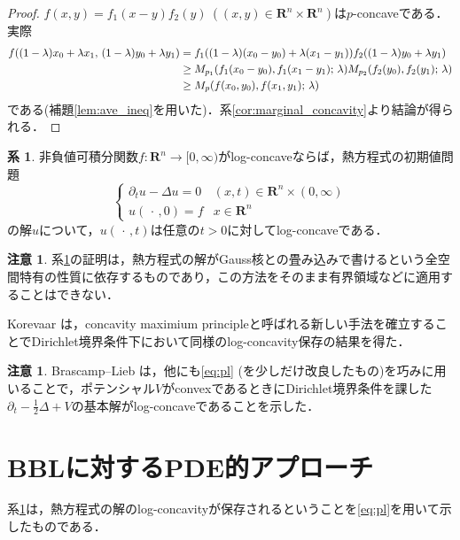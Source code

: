 \documentclass[a4j]{ltjsarticle}
\newcommand{\Rset}{\mathbf{R}}
\newcommand{\1}{\bm{1}}
\newcommand{\M}[4]{M_{#1}\qty(#2,#3;\,#4)}
\numberwithin{equation}{section}
\theoremstyle{definition}
\newtheorem{cor}[thm]{系}
\newtheorem{rmk}[thm]{注意}
\begin{document}
\begin{proof}
    $f(x,y)=f_1(x-y)f_2(y)\ ((x,y)\in \Rset^n\times\Rset^n)$は$p$-concaveである．実際
    \begin{align}
        f((1-\lambda)x_0+\lambda x_1,\,(1-\lambda)y_0+\lambda y_1)&=f_1((1-\lambda)(x_0-y_0)+\lambda(x_1-y_1))f_2((1-\lambda)y_0+\lambda y_1)\\
        &\geq \M{p_1}{f_1(x_0-y_0)}{f_1(x_1-y_1)}{\lambda}\M{p_2}{f_2(y_0)}{f_2(y_1)}{\lambda}\\
        &\geq \M{p}{f(x_0,y_0)}{f(x_1,y_1)}{\lambda}
    \end{align}
    である(補題\ref{lem:ave_ineq}を用いた)．系\ref{cor:marginal_concavity}より結論が得られる．
\end{proof}
\begin{cor}\label{cor:heat_concavity}
    非負値可積分関数$f\colon \Rset^n\to[0,\infty)$がlog-concaveならば，熱方程式の初期値問題
    \begin{equation}
        \left\{
        \begin{array}{rl}
            \partial_{t}u-\Delta u=0 & (x,t)\in\Rset^n\times (0,\infty)\\
            u(\,\cdot\,,0)=f & x\in\Rset^n
        \end{array}
        \right.
    \end{equation}
    の解$u$について，$u(\,\cdot\,,t)$は任意の$t>0$に対してlog-concaveである．
\end{cor}
\begin{rmk}
    系\ref{cor:heat_concavity}の証明は，熱方程式の解がGauss核との畳み込みで書けるという全空間特有の性質に依存するものであり，この方法をそのまま有界領域などに適用することはできない．

    Korevaar \cite{K}は，concavity maximium principleと呼ばれる新しい手法を確立することでDirichlet境界条件下において同様のlog-concavity保存の結果を得た．
\end{rmk}
\begin{rmk}
    Brascamp--Lieb \cite{BL}は，他にも\eqref{eq:pl} (を少しだけ改良したもの)を巧みに用いることで，ポテンシャル$V$がconvexであるときにDirichlet境界条件を課した$\partial_t-\frac{1}{2}\Delta +V$の基本解がlog-concaveであることを示した．
\end{rmk}
\section{BBLに対するPDE的アプローチ}
系\ref{cor:heat_concavity}は，熱方程式の解のlog-concavityが保存されるということを\eqref{eq:pl}を用いて示したものである．
\end{document}
